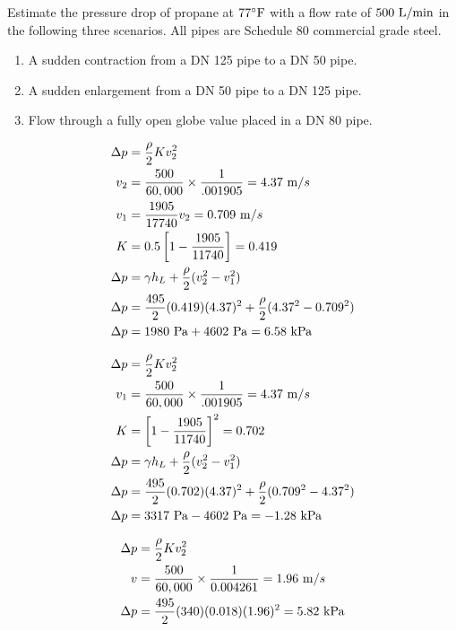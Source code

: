 \documentclass[multi,preview,varwidth=false,border=5,12pt]{standalone}
\begin{document}
\begin{question}

Estimate the pressure drop of propane at $77^\circ\mathrm{F}$ with a flow rate of $500~{\rm L/min}$ in the following three scenarios.  All pipes are Schedule 80 commercial grade steel.

\begin{enumerate}

\item A sudden contraction from a DN 125 pipe to a DN 50 pipe.

\item A sudden enlargement from a DN 50 pipe to a DN 125 pipe.

\item Flow through a fully open globe value placed in a DN 80 pipe.

\end{enumerate}


\begin{solution}

\begin{align*}
\Delta p&= \frac{\rho}{2} K v_2^2 \\
v_2 &= \frac{500}{60,000}\times\frac{1}{.001905}=4.37~\mathrm{m}/s \\
v_1 & = \frac{1905}{17740}v_2=0.709~\mathrm{m}/s\\
K&= 0.5\left[1-\frac{1905}{11740}\right]=0.419 \\
\Delta p &= \gamma h_L + \frac{\rho}{2}(v_2^2-v_1^2)\\
\Delta p &= \frac{495}{2} (0.419) (4.37)^2 + \frac{\rho}{2}(4.37^2-0.709^2)\\
\Delta p &= 1980~\mathrm{Pa} + 4602~\mathrm{Pa}=6.58~\mathrm{kPa}\\
\end{align*}


\begin{align*}
\Delta p&= \frac{\rho}{2} K v_2^2 \\
v_1 &= \frac{500}{60,000}\times\frac{1}{.001905}=4.37~\mathrm{m}/s \\
K&= \left[1-\frac{1905}{11740}\right]^2=0.702 \\
\Delta p &= \gamma h_L + \frac{\rho}{2}(v_2^2-v_1^2)\\
\Delta p &= \frac{495}{2} (0.702) (4.37)^2 + \frac{\rho}{2}(0.709^2-4.37^2)\\
\Delta p&=3317~\mathrm{Pa} - 4602~\mathrm{Pa}=-1.28~\mathrm{kPa}
\end{align*}

\begin{align*}
\Delta p&= \frac{\rho}{2} K v_2^2 \\
v &= \frac{500}{60,000}\times\frac{1}{0.004261}=1.96~\mathrm{m}/s \\
\Delta p&=\frac{495}{2} (340) (0.018) (1.96)^2= 5.82~\mathrm{kPa}
\end{align*}


\end{solution}

\end{question}
\end{document}
